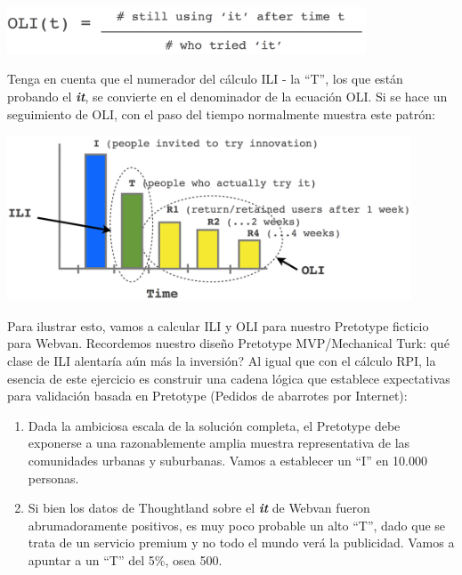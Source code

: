 \documentclass{article}
\begin{document}
\begin{center}
    \includegraphics[width=0.8\textwidth]{OLI}
\end{center}

Tenga en cuenta que el numerador del c\'alculo ILI - la ``T'', los que est\'an probando el \textbf{\textit{it}}, se convierte en el denominador de la ecuaci\'on OLI. Si se hace un seguimiento de OLI, con el paso del tiempo normalmente muestra este patr\'on:

\begin{center}
    \includegraphics[width=0.9\textwidth]{OLI_2}
\end{center}

Para ilustrar esto, vamos a calcular ILI y OLI para nuestro Pretotype ficticio para Webvan. Recordemos nuestro dise\~no Pretotype MVP/Mechanical Turk: qu\'e clase de ILI alentar\'ia a\'un m\'as la inversi\'on? Al igual que con el c\'alculo RPI, la esencia de este ejercicio es construir una cadena l\'ogica que establece expectativas para validaci\'on basada en Pretotype (Pedidos de abarrotes por Internet):

\begin{enumerate}

\item Dada la ambiciosa escala de la soluci\'on completa, el Pretotype debe exponerse a una razonablemente amplia muestra representativa de las comunidades urbanas y suburbanas. Vamos a establecer un ``I'' en 10.000 personas.

\item Si bien los datos de Thoughtland sobre el \textbf{\textit{it}} de Webvan fueron abrumadoramente positivos, es muy poco probable un alto ``T'', dado que se trata de un servicio premium y no todo el mundo ver\'a la publicidad. Vamos a apuntar a un ``T'' del 5\%, osea 500.

\end{enumerate}
\end{document}
